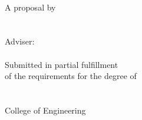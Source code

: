 \begin{titlepage}
\center
\vspace*{2.54cm}

\mstitle\\[2cm]

A \MakeLowercase{\mstype} proposal by\\[2cm]

\student\\
\studentnumber\\[2cm]

\mstype{} Adviser:\\
\adviser\\[2cm]

Submitted in partial fulfillment\\of the requirements for the degree of\\
\degree\\[2cm]

\department\\
College of Engineering\\
\university{} \campus\\[2cm]

\submissiondate

\end{titlepage}
